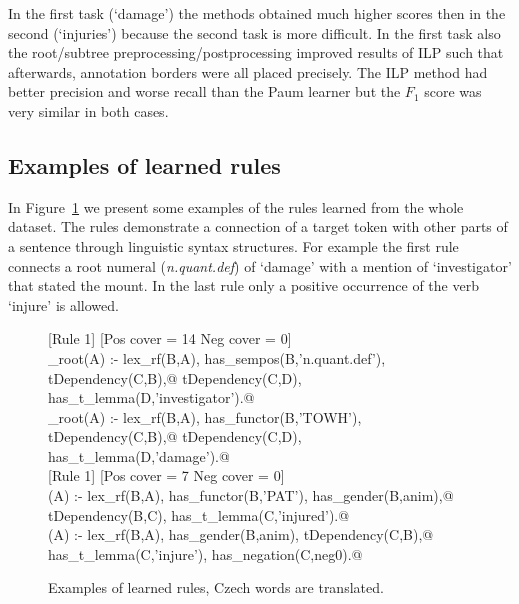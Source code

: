 In the first task (`damage') the methods obtained much higher scores then in the second (`injuries') because the second task is more difficult. In the first task also the root/subtree preprocessing/postprocessing improved results of ILP such that afterwards, annotation borders were all placed precisely. The ILP method had better precision and worse recall than the Paum learner but the $F_1$ score was very similar in both cases.

\subsection{Examples of learned rules}

In Figure~\ref{fig:rules} we present some examples of the rules learned from the whole dataset. The rules demonstrate a connection of a target token with other parts of a sentence through linguistic syntax structures. For example the first rule connects a root numeral (\emph{n.quant.def}) of `damage' with a mention of `investigator' that stated the mount. In the last rule only a positive occurrence of the verb `injure' is allowed.

\begin{figure}
	\scriptsize
[Rule 1] [Pos cover = 14 Neg cover = 0]\\
\verb@damage_root(A) :- lex_rf(B,A), has_sempos(B,'n.quant.def'), tDependency(C,B),@
\verb@   tDependency(C,D), has_t_lemma(D,'investigator').@ %
\smallskip\newline
[Rule 2] [Pos cover = 13 Neg cover = 0]\\
\verb@damage_root(A) :- lex_rf(B,A), has_functor(B,'TOWH'), tDependency(C,B),@
\verb@   tDependency(C,D), has_t_lemma(D,'damage').@\\


[Rule 1] [Pos cover = 7 Neg cover = 0]\\
\verb@injuries(A) :- lex_rf(B,A), has_functor(B,'PAT'), has_gender(B,anim),@
\verb@   tDependency(B,C), has_t_lemma(C,'injured').@
\smallskip\newline
[Rule 8] [Pos cover = 6 Neg cover = 0]\\
\verb@injuries(A) :- lex_rf(B,A), has_gender(B,anim), tDependency(C,B),@
\verb@   has_t_lemma(C,'injure'), has_negation(C,neg0).@
	\caption{Examples of learned rules, Czech words are translated.}
	\label{fig:rules}
\end{figure}





